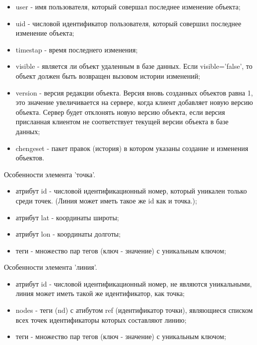 \documentclass[12pt,a4paper,oneside]{article} %
\begin{document}
\begin{itemize}
\item user - имя пользователя, который совершал последнее изменение \linebreak
объекта;
\item uid - числовой идентификатор пользователя, который совершил \linebreak
последнее изменение объекта;
\item timestap - время последнего изменения;
\item visible - является ли объект удаленным в базе данных. Если visible='false', \linebreak
то объект должен быть возвращен вызовом истории изменений;
\item version - версия редакции объекта. Версия вновь созданных объектов \linebreak
равна 1, это значение увеличивается на сервере, когда клиент добавляет \linebreak
новую версию объекта. Сервер будет отклонять новую версию объекта, если \linebreak
версия присланная клиентом не соответствует текущей версии объекта в \linebreak
базе данных;
\item chengeset - пакет правок (история) в котором указаны создание и \linebreak
изменения объектов.
\end{itemize}

Особенности элемента 'точка'.

\begin{itemize}
\item атрибут id - числовой идентификационный номер, который уникален \linebreak
только среди точек. (Линия может иметь такое же id как и точка.);
\item атрибут lat - координаты широты;
\item атрибут lon - координаты долготы;
\item теги - множество пар тегов (ключ - значение) с уникальным ключом;
\end{itemize}

Особенности элемента 'линия'.

\begin{itemize}
\item атрибут id - числовой идентификационный номер, не являются \linebreak
уникальными, линия может иметь такой же идентификатор, как точка;
\item nodes - теги (nd) с атибутом ref (идентификатор точки), являющиеся \linebreak
списком всех точек идентификаторы которых составляют линию;
\item теги - множество пар тегов (ключ - значение) с уникальным ключом;
\end{itemize}
\end{document}
